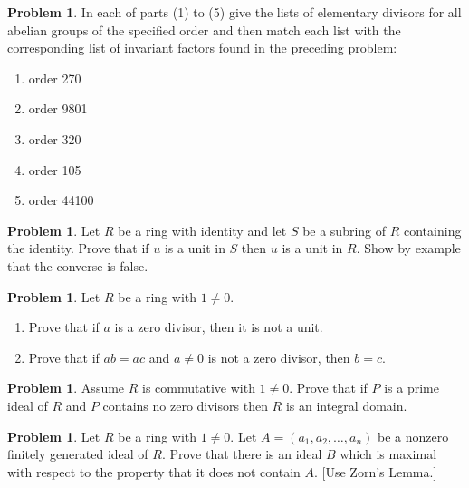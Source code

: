 \documentclass{amsart}
\numberwithin{equation}{section}
\theoremstyle{definition}
\newtheorem{problem}[thm]{Problem}
\begin{document}
\begin{problem}
  In each of parts (1) to (5) give the lists of elementary divisors
  for all abelian groups of the specified order and then match each
  list with the corresponding list of invariant factors found
  in the preceding problem:
\begin{enumerate}
\item order 270
\item order 9801
\item order 320
\item order 105
\item order 44100
\end{enumerate}
\end{problem}


\begin{problem}
  Let \(R\) be a ring with identity and let \(S\) be a subring of
  \(R\) containing the identity. Prove that if \(u\) is a unit in
  \(S\) then \(u\) is a unit in \(R\). Show by example that the
  converse is false.
\end{problem}

\begin{problem}
  Let \( R \) be a ring with \( 1\ne 0 \).
  \begin{enumerate}
  \item Prove that if \( a \) is a zero divisor, then it is not a
    unit.
  \item Prove that if \( ab=ac \) and \( a\ne0 \) is not a zero divisor,
  then \( b=c \).
  \end{enumerate}
\end{problem}

\begin{problem}
 Assume \(R\) is commutative with \( 1\ne0 \). Prove that if \(P\) is a prime ideal of \(R\) and \(P\) contains no zero divisors then \(R\) is an integral domain. 
\end{problem}

\begin{problem}
  Let \( R \) be a ring with \( 1\ne 0 \).
  Let \(A=\left(a_1, a_2, \ldots, a_n\right)\) be a nonzero finitely
  generated ideal of \(R\). Prove that there is an ideal \(B\) which
  is maximal with respect to the property that it does not contain
  \(A\). [Use Zorn’s Lemma.]
\end{problem}
\end{document}
